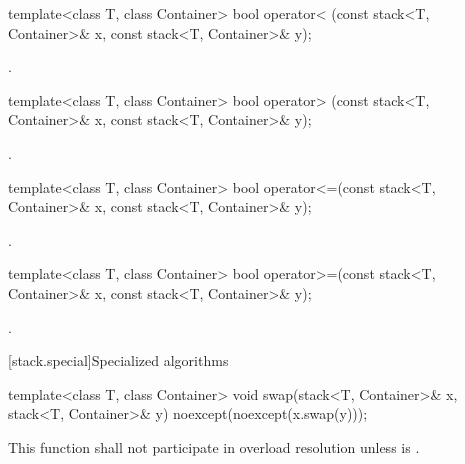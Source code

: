 \begin{codeblock}
\begin{codeblock}
\begin{codeblock}
%
\begin{itemdecl}
template<class T, class Container>
  bool operator< (const stack<T, Container>& x, const stack<T, Container>& y);
\end{itemdecl}

\begin{itemdescr}
\pnum
\returns
{}.
\end{itemdescr}

%
\begin{itemdecl}
template<class T, class Container>
  bool operator> (const stack<T, Container>& x, const stack<T, Container>& y);
\end{itemdecl}

\begin{itemdescr}
\pnum
\returns
{}.
\end{itemdescr}

%
\begin{itemdecl}
template<class T, class Container>
  bool operator<=(const stack<T, Container>& x, const stack<T, Container>& y);
\end{itemdecl}

\begin{itemdescr}
\pnum
\returns
{}.
\end{itemdescr}

%
\begin{itemdecl}
template<class T, class Container>
    bool operator>=(const stack<T, Container>& x, const stack<T, Container>& y);
\end{itemdecl}

\begin{itemdescr}
\pnum
\returns
{}.
\end{itemdescr}

[stack.special]{Specialized algorithms}

%
\begin{itemdecl}
template<class T, class Container>
  void swap(stack<T, Container>& x, stack<T, Container>& y) noexcept(noexcept(x.swap(y)));
\end{itemdecl}

\begin{itemdescr}
\pnum
\remarks
This function shall not participate in overload resolution
unless  is .


\end{itemdescr}
\end{codeblock}
\end{codeblock}
\end{codeblock}
